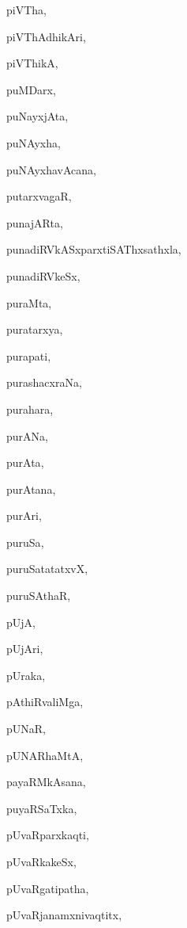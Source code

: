 \begin{multicols}{2}
{piVTha}, \pageref{piVTha}

{piVThAdhikAri}, \pageref{piVThAdhikAri}

{piVThikA}, \pageref{piVThikA}

{puMDarx}, \pageref{puMDarx}

{puNayxjAta}, \pageref{puNayxjAta}

{puNAyxha}, \pageref{puNAyxha}

{puNAyxhavAcana}, \pageref{puNAyxhavAcana}

{putarxvagaR}, \pageref{putarxvagaR}

{punajARta}, \pageref{punajARta}

{punadiRVkASxparxtiSAThxsathxla}, \pageref{punadiRVkASxparxtiSAThxsathxla}

{punadiRVkeSx}, \pageref{punadiRVkeSx}

{puraMta}, \pageref{puraMta}

{puratarxya}, \pageref{puratarxya}

{purapati}, \pageref{purapati}

{purashacxraNa}, \pageref{purashacxraNa}

{purahara}, \pageref{purahara}

{purANa}, \pageref{purANa}

{purAta}, \pageref{purAta}

{purAtana}, \pageref{purAtana}

{purAri}, \pageref{purAri}

{puruSa}, \pageref{puruSa}

{puruSatatatxvX}, \pageref{puruSatatatxvX}

{puruSAthaR}, \pageref{puruSAthaR}

{pUjA}, \pageref{pUjA}

{pUjAri}, \pageref{pUjAri}

{pUraka}, \pageref{pUraka}

{pAthiRvaliMga}, \pageref{pAthiRvaliMga}

{pUNaR}, \pageref{pUNaR}

{pUNARhaMtA}, \pageref{pUNARhaMtA}

{payaRMkAsana}, \pageref{payaRMkAsana}

{puyaRSaTxka}, \pageref{puyaRSaTxka}

{pUvaRparxkaqti}, \pageref{pUvaRparxkaqti}

{pUvaRkakeSx}, \pageref{pUvaRkakeSx}

{pUvaRgatipatha}, \pageref{pUvaRgatipatha}

{pUvaRjanamxnivaqtitx}, \pageref{pUvaRjanamxnivaqtitx}


\end{multicols}
